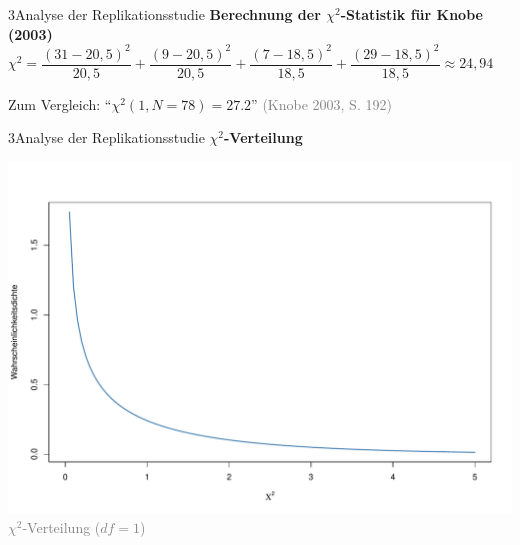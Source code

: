 \documentclass[xcolor=table,9pt,aspectratio=169]{beamer}
\begin{document}
\begin{frame}{\vspace*{10mm}3\hspace*{1em}Analyse der Replikationsstudie}
\textbf{Berechnung der $\chi^{2}$-Statistik für Knobe (2003)}\\
\smallskip
$\chi^{2}=\dfrac{(31-20,5)^{2}}{20,5}+\dfrac{(9-20,5)^{2}}{20,5}+\dfrac{(7-18,5)^{2}}{18,5}+\dfrac{(29-18,5)^{2}}{18,5}\approx24,94$

\bigskip
Zum Vergleich: \enquote{$\chi^{2}(1,N=78)=27.2$} \textcolor{gray}{(Knobe 2003, S. 192)}
\end{frame}


\begin{frame}{\vspace*{10mm}3\hspace*{1em}Analyse der Replikationsstudie}
\textbf{$\chi^{2}$-Verteilung}\\
\begin{center}
   \includegraphics[width=0.5\linewidth]{figures/replication_knobe_distribution.pdf}\\
   \textcolor{gray}{$\chi^{2}$-Verteilung ($df=1$)}
\end{center}

\end{frame}
\end{document}
